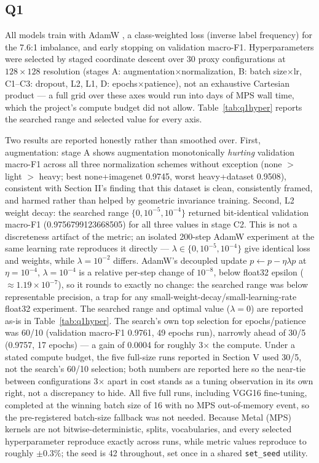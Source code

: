 \documentclass[conference]{IEEEtran}
\begin{document}
\subsection{Q1}
All models train with AdamW \cite{loshchilov2019adamw}, a
class-weighted loss (inverse label frequency) for the 7.6:1 imbalance,
and early stopping on validation macro-F1. Hyperparameters were
selected by staged coordinate descent over 30 proxy configurations at
$128\times128$ resolution (stages A: augmentation$\times$normalization,
B: batch size$\times$lr, C1--C3: dropout, L2, L1, D:
epochs$\times$patience), not an exhaustive Cartesian product --- a full
grid over these axes would run into days of MPS wall time, which the
project's compute budget did not allow. Table~\ref{tab:q1hyper} reports
the searched range and selected value for every axis.



Two results are reported honestly rather than smoothed over. First, augmentation: stage A shows augmentation monotonically
\emph{hurting} validation macro-F1 across all three normalization
schemes without exception (none $>$ light $>$ heavy; best
none+imagenet 0.9745, worst heavy+dataset 0.9508), consistent with
Section II's finding that this dataset is clean, consistently framed,
and harmed rather than helped by geometric invariance training.
Second, L2 weight decay: the searched range
$\{0, 10^{-5}, 10^{-4}\}$ returned bit-identical validation macro-F1
(0.9756799123668505) for all three values in stage C2. This is not a
discreteness artifact of the metric; an isolated 200-step AdamW
experiment at the same learning rate reproduces it directly ---
$\lambda\in\{0, 10^{-5}, 10^{-4}\}$ give identical loss and weights,
while $\lambda=10^{-2}$ differs. AdamW's decoupled update
$p \leftarrow p - \eta\lambda p$ at $\eta=10^{-4}$, $\lambda=10^{-4}$
is a relative per-step change of $10^{-8}$, below float32 epsilon
($\approx 1.19\times10^{-7}$), so it rounds to exactly no change: the
searched range was below representable precision, a trap for any
small-weight-decay/small-learning-rate float32 experiment. The searched
range and optimal value ($\lambda=0$) are reported as-is in
Table~\ref{tab:q1hyper}. The search's own top selection for
epochs/patience was 60/10 (validation macro-F1 0.9761, 49 epochs run),
narrowly ahead of 30/5 (0.9757, 17 epochs) --- a gain of 0.0004 for
roughly 3$\times$ the compute. Under a stated compute budget, the five
full-size runs reported in Section V used 30/5, not the search's
60/10 selection; both numbers are reported here so the near-tie between
configurations 3$\times$ apart in cost stands as a tuning observation
in its own right, not a discrepancy to hide. All five full runs,
including VGG16 fine-tuning, completed at the winning batch size of 16
with no MPS out-of-memory event, so the pre-registered batch-size
fallback was not needed. Because Metal (MPS) kernels are not
bitwise-deterministic, splits, vocabularies, and every selected
hyperparameter reproduce exactly across runs, while metric values
reproduce to roughly $\pm0.3\%$; the seed is 42 throughout, set once in
a shared \texttt{set\_seed} utility.
\end{document}
